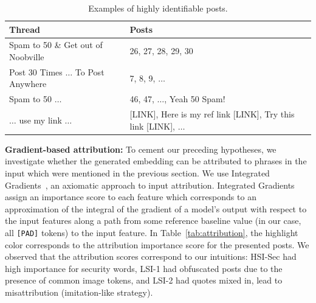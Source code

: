 \begin{table}
    \centering
    \begin{tabularx}{\linewidth}{XX}
    \toprule
        Thread & Posts  \\
    \midrule
         Spam to 50 \&  Get out of Noobville &  26, 27, 28, 29, 30 \\
         Post 30 Times $\dots$ To Post Anywhere& 7, 8, 9, $\dots$\\ 
         Spam to 50 $\dots$ & 46, 47, $\dots$, Yeah 50 Spam! \\
         $\dots$ use my link $\dots$ & {[LINK]}, Here is my ref link {[LINK]}, Try this link {[LINK]}, $\dots$\\
    \bottomrule
    \end{tabularx}
    \caption{Examples of highly identifiable posts.}
    \label{tab:example_posts}
\end{table}

\noindent \textbf{Gradient-based attribution:} To cement our preceding hypotheses, 
we investigate whether the generated embedding can be attributed to phrases in the input which were mentioned in the previous section. 
We use Integrated Gradients~\cite{sundararajan2017axiomatic}, an axiomatic approach to input attribution.
Integrated Gradients assign an importance score to each feature which corresponds to an approximation of the integral of the gradient of a model's output with respect to the input features along a path from some reference baseline value (in our case, all \texttt{[PAD]} tokens) to the  input feature.
In Table~\ref{tab:attribution}, the highlight color corresponds to the attribution importance score for the presented posts.
We observed that the attribution scores correspond to our intuitions: HSI-Sec had high importance for security words, LSI-1 had obfuscated posts due to the presence of common image tokens, and LSI-2 had quotes mixed in, lead to misattribution (imitation-like strategy).


